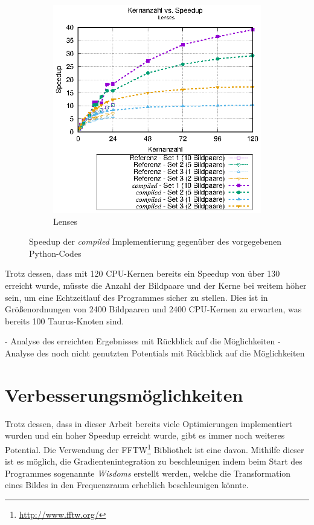 \begin{center}
\begin{figure}[htbp]
\begin{subfigure}[b]{0.45\textwidth}
		\includegraphics[width=\textwidth]{pdf/best_speedup_lenses}
		\caption{Lenses}
		\label{fig:best_speedup_lenses}
	\end{subfigure}
	\caption{Speedup der \textit{compiled} Implementierung gegenüber des vorgegebenen Python-Codes}
	\label{fig:best_speedup}
\end{figure}
\end{center}

Trotz dessen, dass mit 120 \gls{CPU}-Kernen bereits ein Speedup von über 130 erreicht wurde, müsste die Anzahl der Bildpaare und der Kerne bei weitem höher sein, um eine Echtzeitlauf des Programmes sicher zu stellen. Dies ist in Größenordnungen von 2400 Bildpaaren und 2400 \gls{CPU}-Kernen zu erwarten, was bereits 100 Taurus-Knoten sind. 

\begin{correctmore}
	- Analyse des erreichten Ergebnisses mit Rückblick auf die Möglichkeiten
	- Analyse des noch nicht genutzten Potentials mit Rückblick auf die Möglichkeiten
\end{correctmore}

\section{Verbesserungsmöglichkeiten}

Trotz dessen, dass in dieser Arbeit bereits viele Optimierungen implementiert wurden und ein hoher Speedup erreicht wurde, gibt es immer noch weiteres Potential. Die Verwendung der FFTW\footnote{\url{http://www.fftw.org/}} Bibliothek ist eine davon. Mithilfe dieser ist es möglich, die Gradientenintegration zu beschleunigen indem beim Start des Programmes sogenannte \textit{Wisdoms} erstellt werden, welche die Transformation eines Bildes in den Frequenzraum erheblich beschleunigen könnte. 

